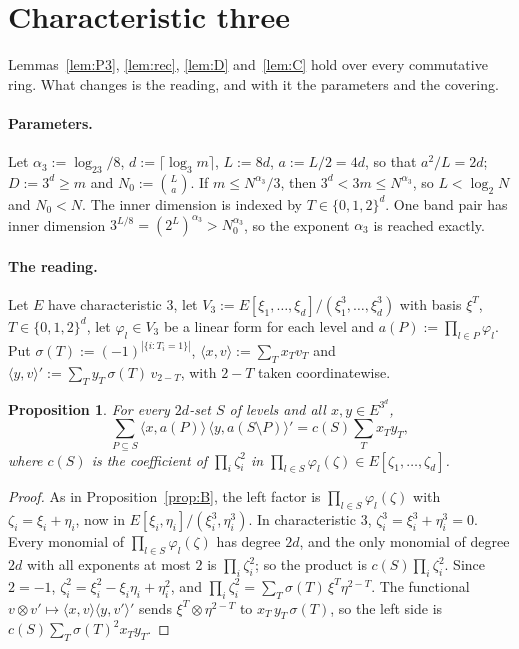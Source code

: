 \documentclass[11pt]{article}
\newtheorem{proposition}[theorem]{Proposition}
\theoremstyle{definition}
\theoremstyle{remark}
\newcommand{\Nz}{N_0}
\newcommand{\pairL}[2]{\langle #1,#2\rangle}
\newcommand{\pairRt}[2]{\langle #1,#2\rangle'}
\begin{document}
\section{Characteristic three}\label{sec:char3}

Lemmas~\ref{lem:P3}, \ref{lem:rec}, \ref{lem:D} and~\ref{lem:C} hold over every commutative ring. What changes is the reading, and with it the parameters and the covering.

\paragraph{Parameters.} Let $\alpha_3:=\log_23/8$, $d:=\lceil\log_3m\rceil$, $L:=8d$, $a:=L/2=4d$, so that $a^2/L=2d$; $D:=3^d\ge m$ and $\Nz:=\binom La$. If $m\le N^{\alpha_3}/3$, then $3^d<3m\le N^{\alpha_3}$, so $L<\log_2N$ and $\Nz<N$. The inner dimension is indexed by $T\in\{0,1,2\}^d$. One band pair has inner dimension $3^{L/8}=(2^L)^{\alpha_3}>\Nz^{\alpha_3}$, so the exponent $\alpha_3$ is reached exactly.

\paragraph{The reading.} Let $E$ have characteristic $3$, let $V_3:=E[\xi_1,\dots,\xi_d]/(\xi_1^3,\dots,\xi_d^3)$ with basis $\xi^T$, $T\in\{0,1,2\}^d$, let $\varphi_l\in V_3$ be a linear form for each level and $a(P):=\prod_{l\in P}\varphi_l$. Put $\sigma(T):=(-1)^{|\{i:T_i=1\}|}$, $\pairL xv:=\sum_Tx_Tv_T$ and $\pairRt yv:=\sum_Ty_T\,\sigma(T)\,v_{2-T}$, with $2-T$ taken coordinatewise.

\begin{proposition}\label{prop:B3}
For every $2d$-set $S$ of levels and all $x,y\in E^{3^d}$,
\[
\sum_{P\subseteq S}\pairL x{a(P)}\,\pairRt y{a(S\setminus P)}=c(S)\sum_Tx_Ty_T,
\]
where $c(S)$ is the coefficient of $\prod_i\zeta_i^2$ in $\prod_{l\in S}\varphi_l(\zeta)\in E[\zeta_1,\dots,\zeta_d]$.
\end{proposition}

\begin{proof}
As in Proposition~\ref{prop:B}, the left factor is $\prod_{l\in S}\varphi_l(\zeta)$ with $\zeta_i=\xi_i+\eta_i$, now in $E[\xi_i,\eta_i]/(\xi_i^3,\eta_i^3)$. In characteristic $3$, $\zeta_i^3=\xi_i^3+\eta_i^3=0$. Every monomial of $\prod_{l\in S}\varphi_l(\zeta)$ has degree $2d$, and the only monomial of degree $2d$ with all exponents at most $2$ is $\prod_i\zeta_i^2$; so the product is $c(S)\prod_i\zeta_i^2$. Since $2=-1$, $\zeta_i^2=\xi_i^2-\xi_i\eta_i+\eta_i^2$, and $\prod_i\zeta_i^2=\sum_T\sigma(T)\,\xi^T\eta^{2-T}$. The functional $v\otimes v'\mapsto\pairL xv\pairRt y{v'}$ sends $\xi^T\otimes\eta^{2-T}$ to $x_T\,y_T\,\sigma(T)$, so the left side is $c(S)\sum_T\sigma(T)^2x_Ty_T$.
\end{proof}
\end{document}
